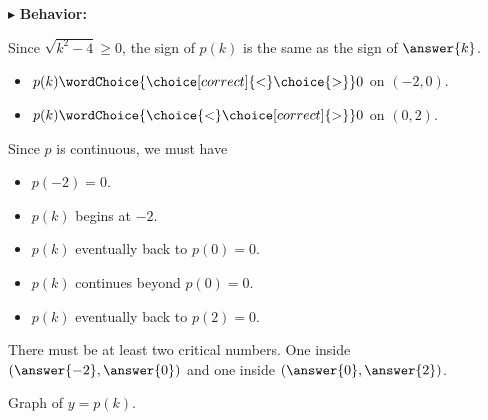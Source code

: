 \documentclass{ximera}
\begin{document}
$\blacktriangleright$ \textbf{\textcolor{blue!55!black}{Behavior:}}  



\begin{explanation}

Since $\sqrt{k^2 - 4} \geq 0$, the sign of $p(k)$ is the same as the sign of $\answer{k}$.

\begin{itemize}
\item  $p(k) \wordChoice{\choice[correct]{<} \choice{>}}  0$ on $(-2, 0)$.
\item  $p(k) \wordChoice{\choice{<} \choice[correct]{>}}  0$ on $(0, 2)$.
\end{itemize}


Since $p$ is continuous, we must have 


\begin{itemize}
\item  $p(-2) = 0$.
\item  $p(k)$ begins   at $-2$.
\item  $p(k)$ eventually   back to $p(0) = 0$.
\item  $p(k)$ continues   beyond $p(0) = 0$.
\item  $p(k)$ eventually   back to $p(2) = 0$.
\end{itemize}


There must be at least two critical numbers.  One inside $\left( \answer{-2}, \answer{0} \right)$ and one inside $\left( \answer{0}, \answer{2} \right)$.

\end{explanation}










Graph of $y = p(k)$.
\end{document}
